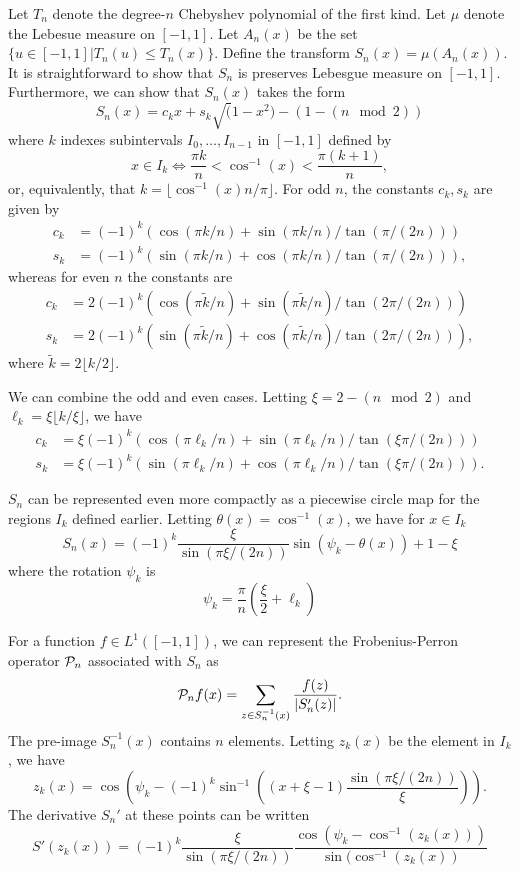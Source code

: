Let $T_n$ denote the degree-$n$ Chebyshev polynomial of the first kind.  Let $\mu$  denote the Lebesue measure on $[-1,1]$. Let $A_n(x)$ be the set $\{u\in [-1,1] | T_n(u)\leq T_n(x) \}$. Define the transform $S_n(x) = \mu(A_n(x))$. It is straightforward to show that $S_n$ is preserves Lebesgue measure on $[-1,1]$. Furthermore, we can show that $S_n(x)$ takes the form
\[
S_n(x) = c_k x + s_k \sqrt(1-x^2) - (1-(n \mod 2))
\]
where $k$ indexes subintervals $I_0, \ldots, I_{n-1}$ in $[-1,1]$ defined by
\[
x\in I_k \Leftrightarrow \frac{\pi k}{n} < \cos^{-1}(x) < \frac{\pi (k+1)}{n},
\]
or, equivalently, that $k=\lfloor \cos^{-1}(x) n/\pi\rfloor$.  For odd $n$, the constants $c_k, s_k$ are given by
$$
\begin{aligned}
c_k &= (-1)^k \left(\cos(\pi k/n) + \sin(\pi k/n)/\tan(\pi/(2n))\right) \\
s_k &= (-1)^k \left(\sin(\pi k/n) + \cos(\pi k/n)/\tan(\pi/(2n))\right),
\end{aligned}
$$
whereas for even $n$ the constants are
$$
\begin{aligned}
c_k &= 2(-1)^k \left(\cos(\pi \tilde{k}/n) + \sin(\pi \tilde{k}/n)/\tan(2\pi/(2n))\right) \\
s_k &= 2(-1)^k \left(\sin(\pi \tilde{k}/n) + \cos(\pi \tilde{k}/n)/\tan(2\pi/(2n))\right),
\end{aligned}
$$
where $\tilde{k}= 2\lfloor k/2\rfloor$.

We can combine the odd and even cases. Letting $\xi=2-(n \mod 2)$ and $\ell_k = \xi \lfloor k/\xi\rfloor$, we have
$$
\begin{aligned}
c_k &= \xi(-1)^k \left(\cos(\pi \ell_k/n) + \sin(\pi \ell_k/n)/\tan(\xi\pi/(2n))\right) \\
s_k &= \xi(-1)^k \left(\sin(\pi \ell_k/n) + \cos(\pi \ell_k/n)/\tan(\xi\pi/(2n))\right).
\end{aligned}
$$

$S_n$ can be represented even more compactly as a piecewise circle map for the regions $I_k$ defined earlier. Letting $\theta(x)=\cos^{-1}(x)$, we have for $x\in I_k$
\[
S_n(x) = (-1)^k \frac{\xi}{\sin(\pi\xi/(2n))} \sin(\psi_k - \theta(x)) + 1-\xi
\]
where the rotation $\psi_k$ is
\[
\psi_k = \frac{\pi}{n} \left(\frac{\xi}{2} + \ell_k\right)
\]

For a function $f\in L^1([-1,1])$, we can represent the Frobenius-Perron operator ${\cal P}_n$ associated with $S_n$ as
\[ {\cal P}_n f(x) = \sum_{z\in S_n^{-1}(x)}\frac{f(z)}{\vert S'_n(z)\vert}. \]
The pre-image $S_n^{-1}(x)$ contains $n$ elements. Letting $z_k(x)$ be the element in $I_k$, we have
\[
z_k(x) = \cos\left(\psi_k - (-1)^k\sin^{-1}\left((x+\xi-1)\frac{\sin(\pi\xi/(2n))}{\xi}\right)\right). 
\]
The derivative $S_n'$ at these points can be written
\[
S'(z_k(x)) = (-1)^k \frac{\xi}{\sin(\pi\xi/(2n))} \frac{\cos(\psi_k - \cos^{-1}(z_k(x)))}{\sin(\cos^{-1}(z_k(x))}
\]

